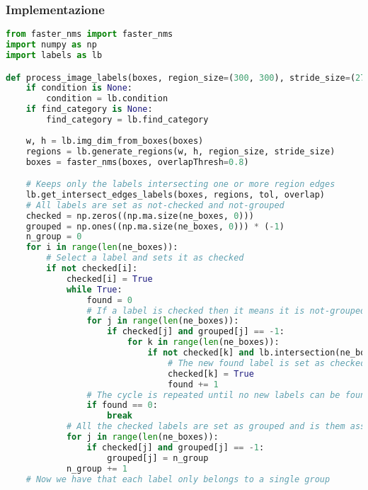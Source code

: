 \subsubsection{Implementazione}
\begin{lstlisting}[language=Python, caption=Python example]
from faster_nms import faster_nms
import numpy as np
import labels as lb

def process_image_labels(boxes, region_size=(300, 300), stride_size=(270, 270), overlap=(0, 0), tol=0, condition=None, find_category=None):
    if condition is None:
        condition = lb.condition
    if find_category is None:
        find_category = lb.find_category
        
    w, h = lb.img_dim_from_boxes(boxes)
    regions = lb.generate_regions(w, h, region_size, stride_size)
    boxes = faster_nms(boxes, overlapThresh=0.8)

    # Keeps only the labels intersecting one or more region edges
    lb.get_intersect_edges_labels(boxes, regions, tol, overlap)
    # All labels are set as not-checked and not-grouped
    checked = np.zeros((np.ma.size(ne_boxes, 0)))
    grouped = np.ones((np.ma.size(ne_boxes, 0))) * (-1)
    n_group = 0
    for i in range(len(ne_boxes)):
        # Select a label and sets it as checked
        if not checked[i]:
            checked[i] = True
            while True:
                found = 0
                # If a label is checked then it means it is not-grouped
                for j in range(len(ne_boxes)):
                    if checked[j] and grouped[j] == -1:
                        for k in range(len(ne_boxes)):
                            if not checked[k] and lb.intersection(ne_boxes[j, :], ne_boxes[k, :], tol) and condition(ne_boxes[j, :], ne_boxes[k, :]) and lb.intersect_common_edge(ne_boxes[j, :], ne_boxes[k, :], regions, tol, overlap) and not lb.belong_same_region_strict(ne_boxes[j, :], ne_boxes[k, :], regions, 0):
                                # The new found label is set as checked
                                checked[k] = True
                                found += 1
                # The cycle is repeated until no new labels can be found
                if found == 0:
                    break
            # All the checked labels are set as grouped and is them assigned a number with the purpose of identify their group ID
            for j in range(len(ne_boxes)):
                if checked[j] and grouped[j] == -1:
                    grouped[j] = n_group
            n_group += 1
    # Now we have that each label only belongs to a single group


\end{lstlisting}
